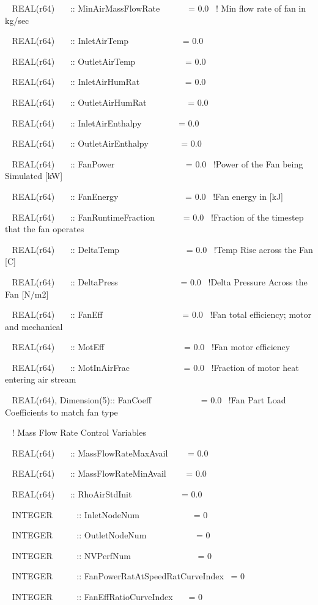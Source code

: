 ~ REAL(r64)~~~ :: MinAirMassFlowRate~~~~~~ = 0.0~ ! Min flow rate of fan in kg/sec

~ REAL(r64)~~~ :: InletAirTemp~~~~~~~~~~~~ = 0.0

~ REAL(r64)~~~ :: OutletAirTemp~~~~~~~~~~~ = 0.0

~ REAL(r64)~~~ :: InletAirHumRat~~~~~~~~~~ = 0.0

~ REAL(r64)~~~ :: OutletAirHumRat~~~~~~~~~ = 0.0

~ REAL(r64)~~~ :: InletAirEnthalpy~~~~~~~~ = 0.0

~ REAL(r64)~~~ :: OutletAirEnthalpy~~~~~~~ = 0.0

~ REAL(r64)~~~ :: FanPower~~~~~~~~~~~~~~~~ = 0.0~ !Power of the Fan being Simulated {[}kW{]}

~ REAL(r64)~~~ :: FanEnergy~~~~~~~~~~~~~~~ = 0.0~ !Fan energy in {[}kJ{]}

~ REAL(r64)~~~ :: FanRuntimeFraction~~~~~~ = 0.0~ !Fraction of the timestep that the fan operates

~ REAL(r64)~~~ :: DeltaTemp~~~~~~~~~~~~~~~ = 0.0~ !Temp Rise across the Fan {[}C{]}

~ REAL(r64)~~~ :: DeltaPress~~~~~~~~~~~~~~ = 0.0~ !Delta Pressure Across the Fan {[}N/m2{]}

~ REAL(r64)~~~ :: FanEff~~~~~~~~~~~~~~~~~~ = 0.0~ !Fan total efficiency; motor and mechanical

~ REAL(r64)~~~ :: MotEff~~~~~~~~~~~~~~~~~~ = 0.0~ !Fan motor efficiency

~ REAL(r64)~~~ :: MotInAirFrac~~~~~~~~~~~~ = 0.0~ !Fraction of motor heat entering air stream

~ REAL(r64), Dimension(5):: FanCoeff~~~~~~~~~~~ = 0.0~ !Fan Part Load Coefficients to match fan type

~ ! Mass Flow Rate Control Variables

~ REAL(r64)~~~ :: MassFlowRateMaxAvail~~~~ = 0.0

~ REAL(r64)~~~ :: MassFlowRateMinAvail~~~~ = 0.0

~ REAL(r64)~~~ :: RhoAirStdInit~~~~~~~~~~~ = 0.0

~ INTEGER~~~~~ :: InletNodeNum~~~~~~~~~~~~ = 0

~ INTEGER~~~~~ :: OutletNodeNum~~~~~~~~~~~ = 0

~ INTEGER~~~~~ :: NVPerfNum~~~~~~~~~~~~~~~ = 0

~ INTEGER~~~~~ :: FanPowerRatAtSpeedRatCurveIndex~ = 0

~ INTEGER~~~~~ :: FanEffRatioCurveIndex~~~ = 0

